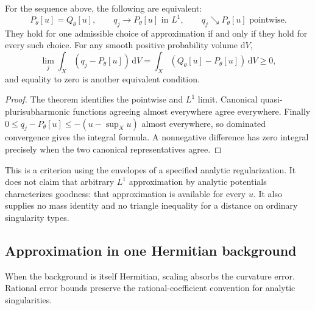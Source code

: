 \begin{corollary}\label{cor:dyadic-goodness-criterion}
For the sequence above, the following are equivalent:
\[
 P_\theta[u]=Q_\theta[u],\qquad
 q_j\longrightarrow P_\theta[u]\text{ in }L^1,
 \qquad q_j\searrow P_\theta[u]\text{ pointwise}.
\]
They hold for one admissible choice of approximation if and only if they hold for every such choice. For any smooth positive probability volume $\mathrm{d}V$,
\[
 \lim_j\int_X(q_j-P_\theta[u])\,\mathrm{d}V
   =\int_X(Q_\theta[u]-P_\theta[u])\,\mathrm{d}V\geq0,
\]
and equality to zero is another equivalent condition.
\end{corollary}
\begin{proof}
The theorem identifies the pointwise and $L^1$ limit. Canonical quasi-plurisubharmonic functions agreeing almost everywhere agree everywhere. Finally $0\leq q_j-P_\theta[u]\leq-(u-\sup_Xu)$ almost everywhere, so dominated convergence gives the integral formula. A nonnegative difference has zero integral precisely when the two canonical representatives agree.
\end{proof}

This is a criterion using the envelopes of a specified analytic regularization. It does not claim that arbitrary $L^1$ approximation by analytic potentials characterizes goodness: that approximation is available for every $u$. It also supplies no mass identity and no triangle inequality for a distance on ordinary singularity types.

\subsection{Approximation in one Hermitian background}

When the background is itself Hermitian, scaling absorbs the curvature error. Rational error bounds preserve the rational-coefficient convention for analytic singularities.

